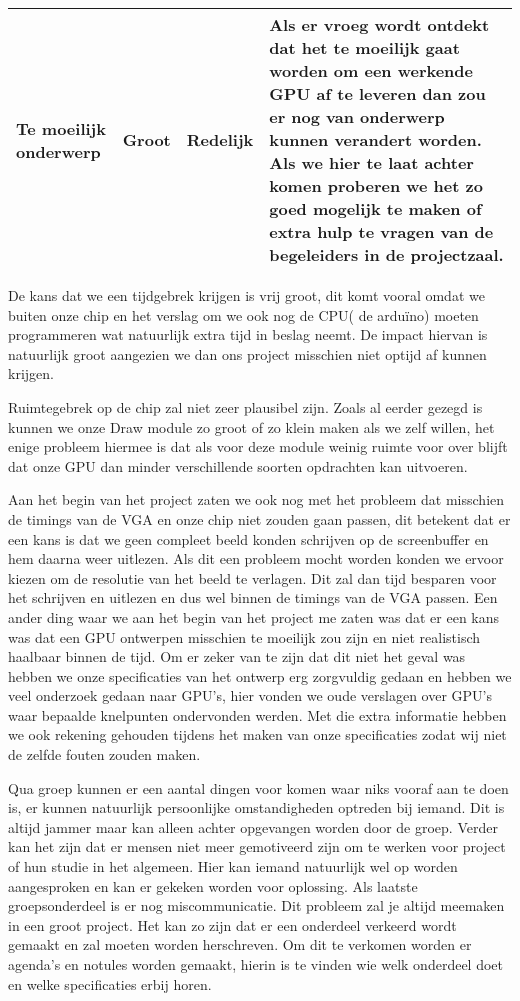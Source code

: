 \documentclass{scrartcl} %
\begin{document}
\begin{table}[H]
\begin{tabular}{| l| l| l| p{}|}
\hline
Te moeilijk onderwerp	& Groot	& Redelijk	& Als er vroeg wordt ontdekt dat het te moeilijk gaat worden om een werkende GPU af te leveren dan zou er nog van onderwerp kunnen verandert worden. Als we hier te laat achter komen proberen we het zo goed mogelijk te maken of extra hulp te vragen van de begeleiders in de projectzaal.\\
\hline
\end{tabular}
\end{table}


De kans dat we een tijdgebrek krijgen is vrij groot, dit komt vooral omdat we buiten onze chip en het verslag om we ook nog de CPU( de arduïno) moeten programmeren wat natuurlijk extra tijd in beslag neemt. De impact hiervan is natuurlijk groot aangezien we dan ons project misschien niet optijd af kunnen krijgen.

Ruimtegebrek op de chip zal niet zeer plausibel zijn. Zoals al eerder gezegd is kunnen we onze Draw module zo groot of zo klein maken als we zelf willen, het enige probleem hiermee is dat als voor deze module weinig ruimte voor over blijft dat onze GPU dan minder verschillende soorten opdrachten kan uitvoeren.

Aan het begin van het project zaten we ook nog met het probleem dat misschien de timings van de VGA en onze chip niet zouden gaan passen, dit betekent dat er een kans is dat we geen compleet beeld konden schrijven op de screenbuffer en hem daarna weer uitlezen. Als dit een probleem mocht worden konden we ervoor kiezen om de resolutie van het beeld te verlagen. Dit zal dan tijd besparen voor het schrijven en uitlezen en dus wel binnen de timings van de VGA passen. Een ander ding waar we aan het begin van het project me zaten was dat er een kans was dat een GPU ontwerpen misschien te moeilijk zou zijn en niet realistisch haalbaar binnen de tijd. Om er zeker van te zijn dat dit niet het geval was hebben we onze specificaties van het ontwerp erg zorgvuldig gedaan en hebben we veel onderzoek gedaan naar GPU's, hier vonden we oude verslagen over GPU's waar bepaalde knelpunten ondervonden werden. Met die extra informatie hebben we ook rekening gehouden tijdens het maken van onze specificaties zodat wij niet de zelfde fouten zouden maken.

Qua groep kunnen er een aantal dingen voor komen waar niks vooraf aan te doen is, er kunnen natuurlijk persoonlijke omstandigheden optreden bij iemand. Dit is altijd jammer maar kan alleen achter opgevangen worden door de groep. Verder kan het zijn dat er mensen niet meer gemotiveerd zijn om te werken voor project of hun studie in het algemeen. Hier kan iemand natuurlijk wel op worden aangesproken en kan er gekeken worden voor oplossing. Als laatste groepsonderdeel is er nog miscommunicatie. Dit probleem zal je altijd meemaken in een groot project. Het kan zo zijn dat er een onderdeel verkeerd wordt gemaakt en zal moeten worden herschreven. Om dit te verkomen worden er agenda's en notules worden gemaakt, hierin is te vinden wie welk onderdeel doet en welke specificaties erbij horen.

\clearpage
\end{document}

